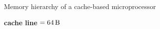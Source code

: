 \documentclass[9pt,xcolor=table]{beamer}
\begin{document}
\begin{frame}
\begin{columns}[c]
\begin{column}{.45\textwidth}
\begin{block}{Memory hierarchy of a cache-based microprocessor}
\begin{itemize}
        \textbf{cache line} $= \unit[64]{B}$
      \end{itemize}
    \end{block}
    \vfill

\end{column}
\end{columns}
\end{frame}
\end{document}
